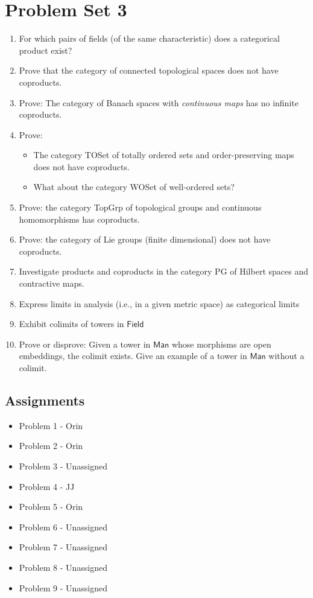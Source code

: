\documentclass{article}
\begin{document}
\section{Problem Set 3}
\begin{enumerate}
	\item For which pairs of fields (of the same characteristic) does a categorical product exist?
	\item Prove that the category of connected topological spaces does not have coproducts.
	\item Prove: The category of Banach spaces with \textit{continuous maps} has no infinite coproducts.
	\item Prove:
	\begin{itemize}
		\item The category \textsf{TOSet} of totally ordered sets and order-preserving maps does not have coproducts.
		\item What about the category \textsf{WOSet} of well-ordered sets? 
	\end{itemize}
\item Prove: the category \textsf{TopGrp} of topological groups and continuous homomorphisms has coproducts.
\item Prove: the category of Lie groups (finite dimensional) does not have coproducts.
\item Investigate products and coproducts in the category \textsf{PG} of Hilbert spaces and contractive maps.
\item Express limits in analysis (i.e., in a given metric space) as categorical limits
\item Exhibit colimits of towers in $\textsf{Field}$
\item Prove or disprove: Given a tower in $\textsf{Man}$ whose morphisms are open embeddings, the colimit exists.  Give an example of a tower in $\textsf{Man}$ without a colimit.
\end{enumerate}
\subsection*{Assignments}
\begin{itemize}
	\item Problem 1 - Orin
	\item Problem 2 - Orin
	\item Problem 3 - Unassigned
	\item Problem 4 - JJ
	\item Problem 5 - Orin
	\item Problem 6 - Unassigned
	\item Problem 7 - Unassigned
	\item Problem 8 - Unassigned
	\item Problem 9 - Unassigned
\end{itemize}
\end{document}
